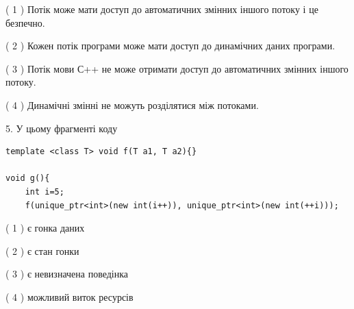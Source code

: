 \documentclass[12pt, ukrainian]{article}
\begin{document}
\begin {large}
{( 1 ) Потік може мати доступ до автоматичних змінних іншого потоку і це безпечно.%

( 2 ) Кожен потік програми може мати доступ до динамічних даних програми.%

( 3 ) Потік мови С++ не може отримати доступ до автоматичних змінних іншого потоку.%

( 4 ) Динамічні змінні не можуть розділятися між потоками.%


5. У цьому фрагменті коду
\begin{verbatim}
template <class T> void f(T a1, T a2){}

void g(){
    int i=5;
    f(unique_ptr<int>(new int(i++)), unique_ptr<int>(new int(++i)));
\end{verbatim}

( 1 ) є гонка даних%

( 2 ) є стан гонки%

( 3 ) є невизначена поведінка%

( 4 ) можливий виток ресурсів%
}
\end {large}
\end{document}
